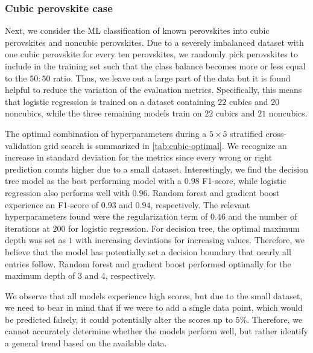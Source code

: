 \subsubsection{Cubic perovskite case}


Next, we consider the ML classification of known perovskites into cubic perovskites and noncubic perovskites. Due to a severely imbalanced dataset with one cubic perovskite for every ten perovskites, we randomly pick perovskites to include in the training set such that the class balance becomes more or less equal to the $50:50$ ratio. Thus, we leave out a large part of the data but it is found helpful to reduce the variation of the evaluation metrics. Specifically, this means that logistic regression is trained on a dataset containing $22$ cubics and $20$ noncubics, while the three remaining models train on $22$ cubics and $21$ noncubics.

The optimal combination of hyperparameters during a $5\times 5$ stratified cross-validation grid search is summarized in \autoref{tab:cubic-optimal}. We recognize an increase in standard deviation for the metrics since every wrong or right prediction counts higher due to a small dataset. Interestingly, we find the decision tree model as the best performing model with a $0.98$ F1-score, while logistic regression also performs well with $0.96$. Random forest and gradient boost experience an F1-score of $0.93$ and $0.94$, respectively. The relevant hyperparameters found were the regularization term of $0.46$ and the number of iterations at $200$ for logistic regression. For decision tree, the optimal maximum depth was set as $1$ with increasing deviations for increasing values. Therefore, we believe that the model has potentially set a decision boundary that nearly all entries follow. Random forest and gradient boost performed optimally for the maximum depth of $3$ and $4$, respectively.

We observe that all models experience high scores, but due to the small dataset, we need to bear in mind that if we were to add a single data point, which would be predicted falsely, it could potentially alter the scores up to $5\%$. Therefore, we cannot accurately determine whether the models perform well, but rather identify a general trend based on the available data.


